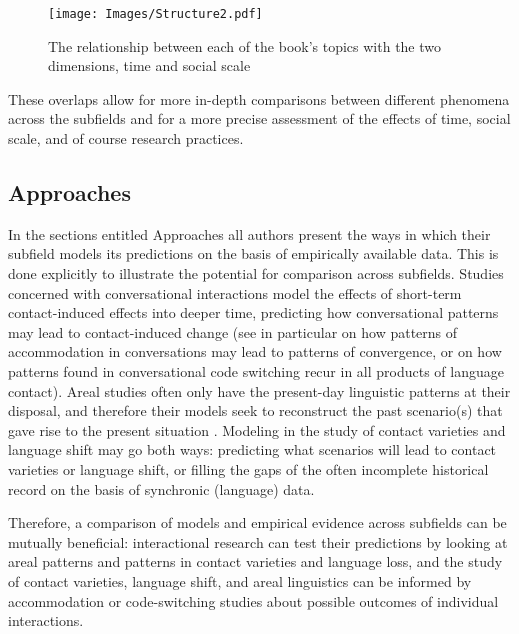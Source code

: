 \documentclass[output=paper]{langscibook}
\begin{document}
\begin{figure}
\caption{The relationship between each of the book's topics with the two dimensions, time and social scale} \label{fig-structure2}
\texttt{[image: Images/Structure2.pdf]}
\label{figure2}
\end{figure}

These overlaps allow for more in-depth comparisons between different phenomena across the subfields and for a more precise assessment of the effects of time, social scale, and of course research practices.

\subsection{Approaches}
In the sections entitled Approaches all authors present the ways in which their subfield models its predictions on the basis of empirically available data. This is done explicitly to illustrate the potential for comparison across subfields. Studies concerned with conversational interactions model the effects of short-term contact-induced effects into deeper time, predicting how conversational patterns may lead to contact-induced change (see in particular \cite{niedzielskietal1996linguistic} on how patterns of accommodation in conversations may lead to patterns of convergence, or \cite{myers2008language} on how patterns found in conversational code switching recur in all products of language contact). Areal studies often only have the present-day linguistic patterns at their disposal, and therefore their models seek to reconstruct the past scenario(s) that gave rise to the present situation \parencite[see e.g.][]{muysken2010scenarios, Nichols2003Diversity}. Modeling in the study of contact varieties and language shift may go both ways: predicting what scenarios will lead to contact varieties or language shift, or filling the gaps of the often incomplete historical record on the basis of synchronic (language) data.

Therefore, a comparison of models and empirical evidence across subfields can be mutually beneficial: interactional research can test their predictions by looking at areal patterns and patterns in contact varieties and language loss, and the study of contact varieties, language shift, and areal linguistics can be informed by accommodation or code-switching studies about possible outcomes of individual interactions.
\end{document}

